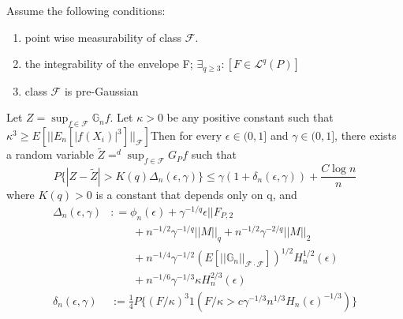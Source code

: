 \documentclass{article}
\begin{document}
\begin{theorem}
    Assume the following conditions:
    \begin{enumerate}[({A}1)]
        \item point wise measurability of class $\mathcal{F}$.
        \item the integrability of the envelope F; $\exists_{ q \geq 3}:[ F \in \mathcal{L}^q(P)]$
        \item class $\mathcal{F}$ is pre-Gaussian
    \end{enumerate}
    Let $ Z= \sup_{f \in \mathcal{F}} \mathbb{G}_n f $. Let $\kappa >0$ be any positive constant such that $\kappa^3 \geq E[ || E_n [ | f(X_i)|^3 ] ||_{\mathcal{F}}] $Then for every $\epsilon \in (0,1] $ and $\gamma \in (0,1] $, there exists a random variable $ \tilde{Z} =^d  \sup _{f \in \mathcal{F}} G_P f $ such that 
    \begin{equation}
        P\{ | Z - \tilde{Z}| > K(q) \Delta _n ( \epsilon, \gamma ) \}  \leq \gamma ( 1 + \delta_n (\epsilon , \gamma )) + \frac{ C \log n}{n}
    \end{equation}
    where $K(q)> 0 $ is a constant that depends only on q, and 
    \begin{align*}
        \Delta_n (\epsilon, \gamma )&: = \phi_n ( \epsilon) + \gamma ^{ -1/q} \epsilon || F _{P,2}\\
        &\qquad+ n^{-1/2} \gamma ^{-1/q} ||M||_q + n^{-1/2} \gamma^{-2/q} ||M||_2\\
        &\qquad+ n^{-1/4} \gamma^{-1/2} ( E[ || \mathbb{G}_n ||_{ \mathcal{F}\cdot \mathcal{F}}])^{1/2} H_n^{1/2} ( \epsilon)\\
        &\qquad+ n^{-1/6} \gamma^{-1/3} \kappa H_n ^{2/3} ( \epsilon)\\
        \delta_n ( \epsilon, \gamma )&:= \frac{1}{4} P \{ (F/\kappa)^3 1( F/ \kappa > c \gamma ^{-1/3}n^{1/3}H_n ( \epsilon)^{-1/3}) \}
    \end{align*}
\end{theorem}
\end{document}
